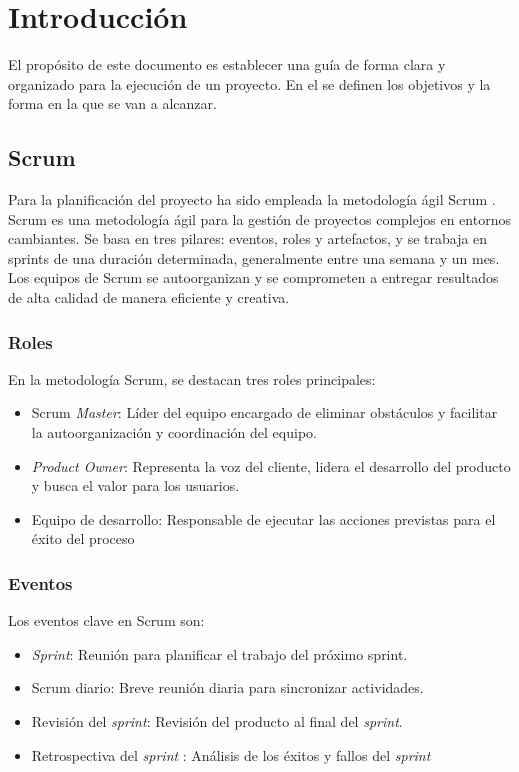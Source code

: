 
\section{Introducción}
El propósito de este documento es establecer una guía de forma clara y organizado para la ejecución de un proyecto. En el se definen los objetivos y la forma en la que se van a alcanzar.


\subsection{Scrum}
Para la planificación del proyecto ha sido empleada la metodología ágil Scrum \cite{scrumMaster2022}. Scrum es una metodología ágil para la gestión de proyectos complejos en entornos cambiantes. Se basa en tres pilares: eventos, roles y artefactos, y se trabaja en sprints de una duración determinada, generalmente entre una semana y un mes. Los equipos de Scrum se autoorganizan y se comprometen a entregar resultados de alta calidad de manera eficiente y creativa.
\subsubsection{Roles}
En la metodología Scrum, se destacan tres roles principales:

\begin{itemize}
\item Scrum \textsl{Master}: Líder del equipo encargado de eliminar obstáculos y facilitar la autoorganización y coordinación del equipo.
\item \textsl{Product Owner}: Representa la voz del cliente, lidera el desarrollo del producto y busca el valor para los usuarios.
\item Equipo de desarrollo: Responsable de ejecutar las acciones previstas para el éxito del proceso
\end{itemize}
\subsubsection{Eventos}
Los eventos clave en Scrum son:
\begin{itemize}


\item \textsl{Sprint}: Reunión para planificar el trabajo del próximo sprint.
\item Scrum diario: Breve reunión diaria para sincronizar actividades.
\item Revisión del \textsl{sprint}: Revisión del producto al final del \textsl{sprint}.
\item Retrospectiva del \textsl{sprint} : Análisis de los éxitos y fallos del \textsl{sprint}
\end{itemize}




